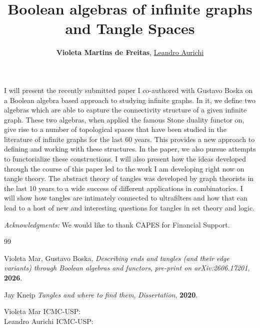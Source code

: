 \documentclass[10pt,a4paper]{amsart}
\begin{document}
\title{\textsf{Boolean algebras of infinite graphs and Tangle Spaces}}
\author{\textbf{Violeta Martins de Freitas}, \underline{Leandro Aurichi}} 

\maketitle
  
\vspace{-0.7cm}
{\small


I will present the recently submitted paper I co-authored with Gustavo Boska on a Boolean algebra based approach to studying infinite graphs. In it, we define two algebras which are able to capture the connectivity structure of a given infinite graph. These two algebras, when applied the famous Stone duality functor on, give rise to a number of topological spaces that have been studied in the literature of infinite graphs for the last 60 years. This provides a new approach to defining and working with these structures. In the paper, we also pursue attempts to functorialize these constructions. I will also present how the ideas developed through the course of this paper led to the work I am developing right now on tangle theory. The abstract theory of tangles was developed by graph theorists in the last 10 years to a wide success of different applications in combinatorics. I will show how tangles are intimately connected to ultrafilters and how that can lead to a host of new and interesting questions for tangles in set theory and logic.

}

\textit{Acknowledgments:} We would like to thank CAPES for Financial Support. \\

\begin{thebibliography}{99} 


 Violeta Mar, Gustavo Boska, \emph{Describing ends and tangles (and their edge variants) through Boolean algebras and functors}, \textit{pre-print on arXiv:2606.17201}, \textbf{2026}.
    
 Jay Kneip \emph{Tangles and where to find them}, \textit{Dissertation}, \textbf{2020}. 
    

\end{thebibliography}


{\scriptsize

Violeta Mar {ICMC-USP}:
\\
Leandro Aurichi {ICMC-USP}:
} 
\end{document}
